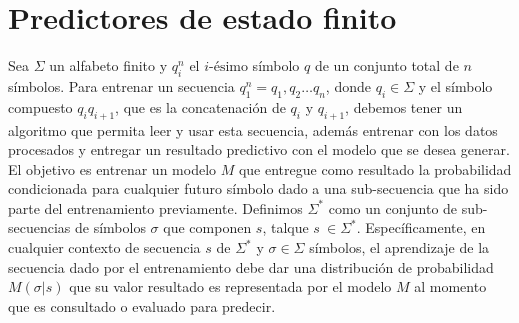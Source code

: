 




\section{Predictores de estado finito}


 

Sea $\Sigma$ un alfabeto finito y $q_{i}^{n}$ el $i\mbox{-ésimo}$ símbolo $q$ de un conjunto total de $n$ símbolos. Para entrenar un secuencia $q_{1}^{n}=q_{1},q_{2} \dots q_{n}$, donde $q_{i} \in \Sigma$ y el símbolo compuesto $q_{i}q_{i+1}$, que es la concatenación de $q_{i}$ y $q_{i+1}$, debemos tener un algoritmo que permita leer y usar esta secuencia, además entrenar con los datos procesados y entregar un resultado predictivo con el modelo que se desea generar. El objetivo es entrenar un modelo $M$ que entregue como resultado la probabilidad condicionada para cualquier futuro símbolo dado a una sub-secuencia que ha sido parte del entrenamiento previamente.
Definimos $\Sigma^{*}$ como un conjunto de sub-secuencias de símbolos $\sigma$ que componen $s$, talque $s \ \in \Sigma^{*} $. Específicamente, en cualquier contexto de secuencia $s$ de $\Sigma^{*}$  y  $\sigma \in \Sigma$ símbolos, el aprendizaje de la secuencia dado por el entrenamiento debe dar una distribución de probabilidad $M(\sigma | s )$ que su valor resultado es representada por el modelo $M$ al momento que es consultado o evaluado para predecir.


